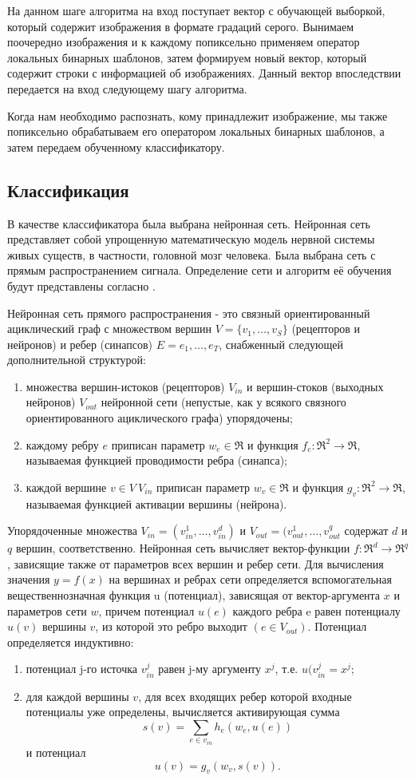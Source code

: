\documentclass[a4paper,12pt]{report}
\numberwithin{equation}{section}
\begin{document}
На данном шаге алгоритма на вход поступает вектор с обучающей выборкой, который
содержит изображения в формате градаций серого. Вынимаем поочередно изображения
и к каждому попиксельно применяем оператор локальных бинарных шаблонов, затем
формируем новый вектор, который содержит строки с информацией об
изображениях. Данный вектор впоследствии передается на вход следующему шагу
алгоритма.


Когда нам необходимо распознать, кому принадлежит изображение, мы также
попиксельно обрабатываем его оператором локальных бинарных шаблонов, а затем
передаем обученному классификатору.

\subsection{Классификация} В качестве классификатора была выбрана нейронная
сеть. Нейронная сеть представляет собой упрощенную математическую модель нервной
системы живых существ, в частности, головной мозг человека. Была выбрана сеть с
прямым распространением сигнала. Определение сети и алгоритм её обучения будут
представлены согласно \cite{Statistical_Methods}.


Нейронная сеть прямого распространения - это связный ориентированный
ациклический граф с множеством вершин $V = \{v_1,\dots,v_S\}$ (рецепторов и
нейронов) и ребер (синапсов) $E = {e_1,\dots,e_T}$, снабженный следующей
дополнительной структурой:
\begin{enumerate}
\item множества вершин-истоков (рецепторов) $V_{in}$ и вершин-стоков (выходных
нейронов) $V_{out}$ нейронной сети (непустые, как у всякого связного
ориентированного ациклического графа) упорядочены;
\item каждому ребру $e$ приписан параметр $w_e \in \Re$ и функция $f_e:\Re^2 \to
\Re$, называемая функцией проводимости ребра (синапса);
\item каждой вершине $v \in V \ V_{in}$ приписан параметр $w_v \in \Re$ и
функция $g_v:\Re^2 \to \Re$, называемая функцией активации вершины (нейрона).
\end{enumerate}

Упорядоченные множества $V_{in} = (v_{in}^1,\dots,v_{in}^d)$ и $V_{out} =
(v_{out}^1,\dots,v_{out}^q$ содержат $d$ и $q$ вершин, соответственно. Нейронная
сеть вычисляет вектор-функции $f : \Re^d \to \Re^q$ , зависящие также от
параметров всех вершин и ребер сети. Для вычисления значения $y = f (x)$ на
вершинах и ребрах сети определяется вспомогательная вещественнозначная функция u
(потенциал), зависящая от вектор-аргумента $x$ и параметров сети $w$, причем
потенциал $u(e)$ каждого ребра e равен потенциалу $u(v)$ вершины $v$, из которой
это ребро выходит $(e \in V_{out})$. Потенциал определяется индуктивно:
\begin{enumerate}
\item потенциал j-го источка $v_{in}^j$ равен j-му аргументу $x^j$,
т.е. $u(v_{in}^j = x^j$;
\item для каждой вершины $v$, для всех входящих ребер которой входные потенциалы
уже определены, вычисляется активирующая сумма
\[ s(v) = \sum_{e \in v_{in}} h_e(w_e,u(e)) \] и потенциал
\[ u(v) = g_v(w_v,s(v)) .\]
\end{enumerate}
\end{document}
